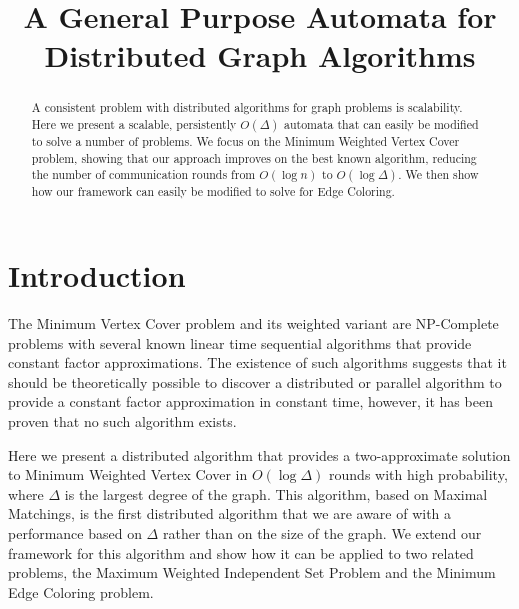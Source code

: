 \documentclass[article, 10pt, letter]{IEEEtran}
\begin{document}
\title{A General Purpose Automata for Distributed Graph Algorithms}

\author{
}

\maketitle

\begin{abstract}
A consistent problem with distributed algorithms for graph problems is scalability. Here we present a scalable, persistently \(O(\Delta)\) automata that can easily be modified to solve a number of problems. We focus on the Minimum Weighted Vertex Cover problem, showing that our approach improves on the best known algorithm, reducing the number of communication rounds from \( O(\log n) \) to \( O(\log \Delta) \). We then show how our framework can easily be modified to solve for Edge Coloring.
\end{abstract}

\section{Introduction}


The Minimum Vertex Cover problem and its weighted variant are NP-Complete problems with several known linear time sequential algorithms that provide constant factor approximations. The existence of such algorithms suggests that it should be theoretically possible to discover a distributed or parallel algorithm to provide a constant factor approximation in constant time, however, it has been proven that no such algorithm exists\cite{1011811}. 

Here we present a distributed algorithm that provides a two-approximate solution to Minimum Weighted Vertex Cover in $O(\log\Delta)$ rounds with high probability, where $\Delta$ is the largest degree of the graph. This algorithm, based on Maximal Matchings, is the first distributed algorithm that we are aware of with a performance based on $\Delta$ rather than on the size of the graph. We extend our framework for this algorithm and show how it can be applied to two related problems, the Maximum Weighted Independent Set Problem and the Minimum Edge Coloring problem.
\end{document}
